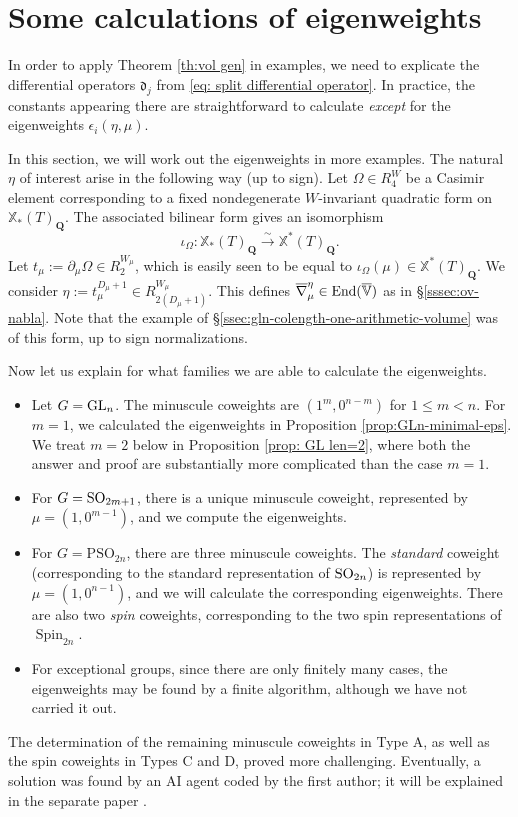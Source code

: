 \documentclass[reqno]{amsart}
\numberwithin{equation}{subsection}
\theoremstyle{definition}
\def\VV{\mathbb{V}}
\newcommand\frd{\mathfrak{d}}
\newcommand\End{\textup{End}}
\newcommand\GL{\textup{GL}}
\newcommand\SO{\textup{SO}}
\DeclareMathOperator\Spin{Spin}
\newcommand\xch{\mathbb{X}^*}
\newcommand\xcoch{\mathbb{X}_*}
\newcommand{\ov}{\overline}
\newcommand{\isom}{\stackrel{\sim}{\to}}
\newcommand{\io}{\iota}
\newcommand{\y}{\eta}
\newcommand\nb{\nabla}
\newcommand\pl{\partial}
\newcommand{\Q}{\mathbf{Q}}
\newcommand{\ol}[1]{\overline{#1}}
\begin{document}
\section{Some calculations of eigenweights}\label{sec:more-examples}

In order to apply Theorem \ref{th:vol gen} in examples, we need to explicate the differential operators $\frd_j$ from \eqref{eq: split differential operator}. In practice, the constants appearing there are straightforward to calculate \emph{except} for the eigenweights $\epsilon_i(\eta, \mu)$. 

In this section, we will work out the eigenweights in more examples. The natural $\eta$ of interest arise in the following way (up to sign). Let $\Omega\in R^{W}_{4}$ be a Casimir element corresponding to a fixed nondegenerate $W$-invariant quadratic form on $\xcoch(T)_{\Q}$. The associated bilinear form gives an isomorphism 
\[
\io_{\Omega}: \xcoch(T)_{\Q}\isom \xch(T)_{\Q}.
\]
Let $t_{\mu}:=\pl_{\mu}\Omega \in R^{W_{\mu}}_{2}$, which is easily seen to be equal to $\io_{\Omega}(\mu)\in \xch(T)_{\Q}$. We consider $\y :=t_{\mu}^{D_\mu+1}\in R^{W_{\mu}}_{2(D_\mu+1)}$. This defines $\ov \nb_{\mu}^\eta \in \End(\ol \VV)$ as in \S \ref{sssec:ov-nabla}. Note that the example of \S \ref{ssec:gln-colength-one-arithmetic-volume} was of this form, up to sign normalizations. 

Now let us explain for what families we are able to calculate the eigenweights. 
\begin{itemize}
\item Let $G = \GL_n$. The minuscule coweights are $(1^m, 0^{n-m})$ for $1 \leq m < n$. For $m=1$, we calculated the eigenweights in Proposition \ref{prop:GLn-minimal-eps}. We treat $m=2$ below in Proposition \ref{prop: GL len=2}, where both the answer and proof are substantially more complicated than the case $m=1$. 

\item For $G = \SO_{2m+1}$, there is a unique minuscule coweight, represented by $\mu = (1, 0^{m-1})$, and we compute the eigenweights. 

\item For $G = \mathrm{PSO}_{2n}$, there are three minuscule coweights. The \emph{standard} coweight (corresponding to the standard representation of $\SO_{2n}$) is represented by $\mu = (1, 0^{n-1})$, and we will calculate the corresponding eigenweights. There are also two \emph{spin} coweights, corresponding to the two spin representations of $\Spin_{2n}$.

\item For exceptional groups, since there are only finitely many cases, the eigenweights may be found by a finite algorithm, although we have not carried it out. 
\end{itemize}
The determination of the remaining minuscule coweights in Type A, as well as the spin coweights in Types C and D, proved more challenging. Eventually, a solution was found by an AI agent coded by the first author; it will be explained in the separate paper \cite{FAI}. 
\end{document}
